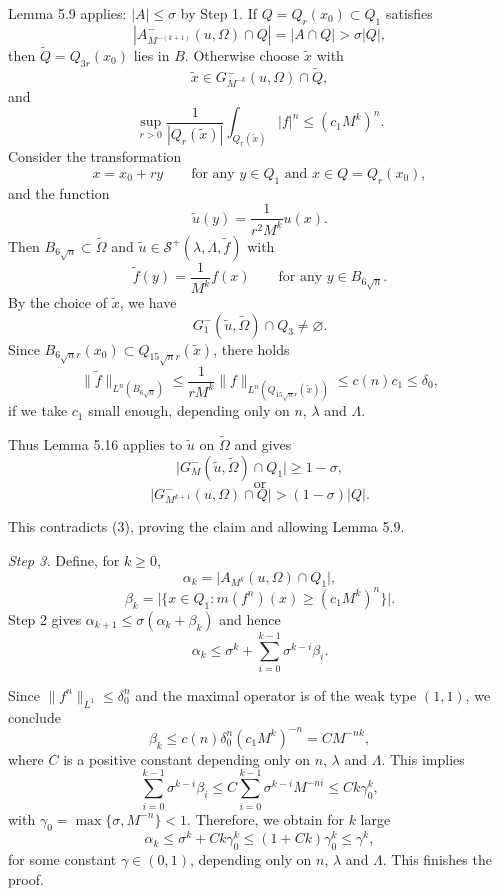 Lemma 5.9 applies: $|A|\le\sigma$ by Step 1. If $Q=Q_r(x_0)\subset Q_1$ satisfies
\begin{equation}
\tag{3}
\left|A_{M^{-(k+1)}}^-(u,\Omega)\cap Q\right|=\left|A\cap Q\right|>\sigma|Q|,
\end{equation}
then $\widetilde Q=Q_{3r}(x_0)$ lies in $B$. Otherwise choose $\widetilde x$ with
\[
\widetilde x\in G_{M^{-k}}^-(u,\Omega)\cap \widetilde Q,
\]
and
\[
\sup_{r>0}\frac{1}{|Q_r(\widetilde x)|}\int_{Q_r(\widetilde x)}|f|^n\le (c_1M^k)^n.
\]
Consider the transformation
\[
x=x_0+ry\qquad\text{for any }y\in Q_1\text{ and }x\in Q=Q_r(x_0),
\]
and the function
\[
\widetilde u(y)=\frac{1}{r^2M^k}u(x).
\]
Then $B_{6\sqrt n}\subset\widetilde\Omega$ and $\widetilde u\in\mathcal S^+(\lambda,\Lambda,\widetilde f)$ with
\[
\widetilde f(y)=\frac{1}{M^k}f(x)\qquad\text{for any }y\in B_{6\sqrt n}.
\]
By the choice of $\widetilde x$, we have
\[
G_1^-(\widetilde u,\widetilde\Omega)\cap Q_3
\neq \varnothing.
\]
Since $B_{6\sqrt n r}(x_0)\subset Q_{15\sqrt n r}(\widetilde x)$, there holds
\[
\|\widetilde f\|_{L^n(B_{6\sqrt n})}\le \frac{1}{rM^k}\|f\|_{L^n(Q_{15\sqrt n r}(\widetilde x))}\le c(n)c_1\le \delta_0,
\]
if we take $c_1$ small enough, depending only on $n$, $\lambda$ and $\Lambda$.

Thus Lemma 5.16 applies to $\tilde u$ on $\widetilde\Omega$ and gives
\[
\lvert G_M^-(\tilde u,\tilde\Omega)\cap Q_1\rvert \geq 1-\sigma,
\]
\[
\text{or}
\]
\[
\lvert G_{M^{k+1}}^-(u,\Omega)\cap Q\rvert > (1-\sigma)\lvert Q\rvert.
\]

This contradicts (3), proving the claim and allowing Lemma 5.9.

\emph{Step 3.} Define, for $k\ge0$,
\[
\alpha_k = \lvert A_{M^k}(u,\Omega)\cap Q_1\rvert,
\]
\[
\beta_k = \lvert\{x\in Q_1 : m(f^n)(x)\geq (c_1M^k)^n\}\rvert.
\]
Step 2 gives $\alpha_{k+1}\le\sigma(\alpha_k+\beta_k)$ and hence
\[
\alpha_k \leq \sigma^k + \sum_{i=0}^{k-1}\sigma^{k-i}\beta_i.
\]

Since $\lVert f^n\rVert_{L^1}\leq \delta_0^n$ and the maximal operator is of the weak type $(1,1)$, we conclude
\[
\beta_k \leq c(n)\delta_0^n(c_1M^k)^{-n} = CM^{-nk},
\]
where $C$ is a positive constant depending only on $n$, $\lambda$ and $\Lambda$. This implies
\[
\sum_{i=0}^{k-1}\sigma^{k-i}\beta_i \leq C\sum_{i=0}^{k-1}\sigma^{k-i}M^{-ni}\leq Ck\gamma_0^k,
\]
with $\gamma_0 = \max\{\sigma,M^{-n}\}<1$. Therefore, we obtain for $k$ large
\[
\alpha_k \leq \sigma^k + Ck\gamma_0^k \leq (1+Ck)\gamma_0^k \leq \gamma^k,
\]
for some constant $\gamma\in(0,1)$, depending only on $n$, $\lambda$ and $\Lambda$. This finishes the
proof.

